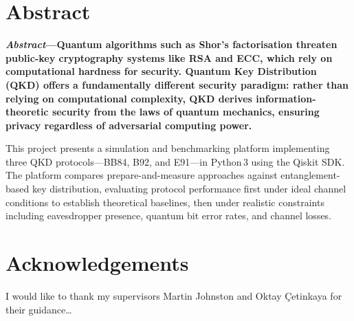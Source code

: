 \documentclass[10pt, a4paper]{report}
\begin{document}

\clearpage
\chapter*{Abstract}

{\fontsize{9}{10}\selectfont\bfseries
\textit{Abstract}---Quantum algorithms such as Shor's factorisation threaten public-key cryptography systems like RSA and ECC, which rely on computational hardness for security. Quantum Key Distribution (QKD) offers a fundamentally different security paradigm: rather than relying on computational complexity, QKD derives information-theoretic security from the laws of quantum mechanics, ensuring privacy regardless of adversarial computing power.

This project presents a simulation and benchmarking platform implementing three QKD protocols---BB84, B92, and E91---in Python\,3 using the Qiskit SDK. The platform compares prepare-and-measure approaches against entanglement-based key distribution, evaluating protocol performance first under ideal channel conditions to establish theoretical baselines, then under realistic constraints including eavesdropper presence, quantum bit error rates, and channel losses.\par
}

\clearpage
\chapter*{Acknowledgements}

I would like to thank my supervisors Martin Johnston and Oktay \c{C}etinkaya for their guidance\ldots

\clearpage
\tableofcontents

\clearpage
\listoffigures
{}

\clearpage
\listoftables
{}

\clearpage
\lstlistoflistings
{}
\end{document}
